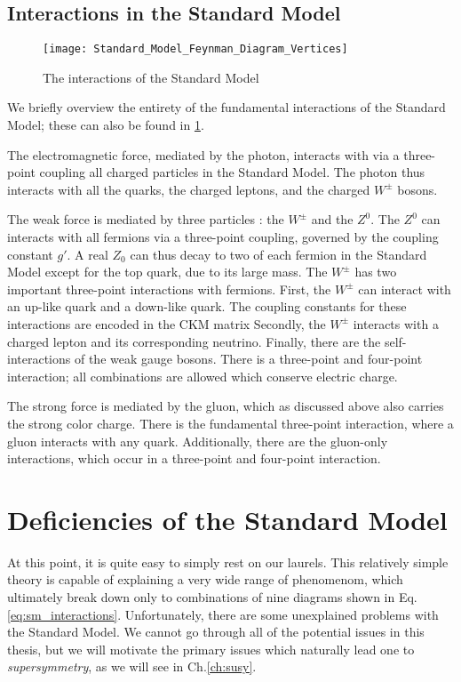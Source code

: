 \subsection{Interactions in the Standard Model}
\begin{figure}\label{fig:sm_interactions}
\caption{The interactions of the Standard Model}
\texttt{[image: Standard\_Model\_Feynman\_Diagram\_Vertices]}
\end{figure}

We briefly overview the entirety of the fundamental interactions of the Standard Model; these can also be found in \ref{fig:sm_interactions}.

The electromagnetic force, mediated by the photon, interacts with via a three-point coupling all charged particles in the Standard Model.
The photon thus interacts with all the quarks, the charged leptons, and the charged $W^\pm$ bosons.

The weak force is mediated by three particles : the $W^\pm$ and the $Z^0$.
The $Z^0$ can interacts with all fermions via a three-point coupling, governed by the coupling constant $g'$. 
A real $Z_0$ can thus decay to two of each fermion in the Standard Model except for the top quark, due to its large mass.
The $W^\pm$ has two important three-point interactions with fermions.
First, the $W^\pm$ can interact with an up-like quark and a down-like quark.
The coupling constants for these interactions are encoded in the CKM matrix 
Secondly, the $W^\pm$ interacts with a charged lepton and its corresponding neutrino.
Finally, there are the self-interactions of the weak gauge bosons.
There is a three-point and four-point interaction; all combinations are allowed which conserve electric charge.

The strong force is mediated by the gluon, which as discussed above also carries the strong color charge.
There is the fundamental three-point interaction, where a gluon interacts with any quark.
Additionally, there are the gluon-only interactions, which occur in a three-point and four-point interaction.

\section{Deficiencies of the Standard Model}

At this point, it is quite easy to simply rest on our laurels.
This relatively simple theory is capable of explaining a very wide range of phenomenom, which ultimately break down only to combinations of nine diagrams shown in Eq.\ref{eq:sm_interactions}.
Unfortunately, there are some unexplained problems with the Standard Model.
We cannot go through all of the potential issues in this thesis, but we will motivate the primary issues which naturally lead one to \textit{supersymmetry}, as we will see in Ch.\ref{ch:susy}.

